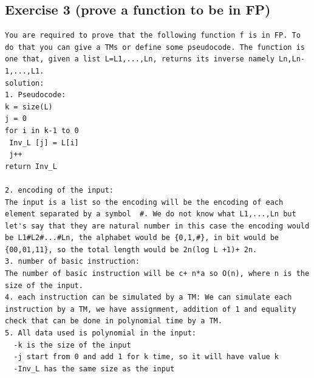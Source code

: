 \subsection{Exercise 3 (prove a function to be in FP)}
\begin{lstlisting}[breaklines]
You are required to prove that the following function f is in FP. To do that you can give a TMs or define some pseudocode. The function is one that, given a list L=L1,...,Ln, returns its inverse namely Ln,Ln-1,...,L1.
solution:
1. Pseudocode:
k = size(L)
j = 0 
for i in k-1 to 0
 Inv_L [j] = L[i]
 j++
return Inv_L

2. encoding of the input:
The input is a list so the encoding will be the encoding of each element separated by a symbol  #. We do not know what L1,...,Ln but let's say that they are natural number in this case the encoding would be L1#L2#...#Ln, the alphabet would be {0,1,#}, in bit would be {00,01,11}, so the total length would be 2n(log L +1)+ 2n.
3. number of basic instruction:
The number of basic instruction will be c+ n*a so O(n), where n is the size of the input.
4. each instruction can be simulated by a TM: We can simulate each instruction by a TM, we have assignment, addition of 1 and equality check that can be done in polynomial time by a TM.
5. All data used is polynomial in the input: 
  -k is the size of the input
  -j start from 0 and add 1 for k time, so it will have value k
  -Inv_L has the same size as the input
\end{lstlisting}

